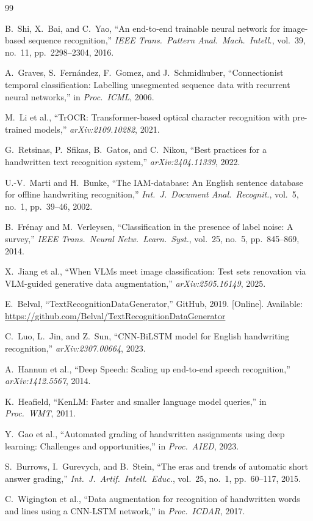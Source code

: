 \documentclass[conference]{IEEEtran}
\begin{document}

\begin{thebibliography}{99}

B.~Shi, X.~Bai, and C.~Yao, ``An end-to-end trainable neural network for image-based sequence recognition,'' \textit{IEEE Trans.\ Pattern Anal.\ Mach.\ Intell.}, vol.~39, no.~11, pp.~2298--2304, 2016.

A.~Graves, S.~Fern\'andez, F.~Gomez, and J.~Schmidhuber, ``Connectionist temporal classification: Labelling unsegmented sequence data with recurrent neural networks,'' in \textit{Proc.\ ICML}, 2006.

M.~Li et al., ``TrOCR: Transformer-based optical character recognition with pre-trained models,'' \textit{arXiv:2109.10282}, 2021.

G.~Retsinas, P.~Sfikas, B.~Gatos, and C.~Nikou, ``Best practices for a handwritten text recognition system,'' \textit{arXiv:2404.11339}, 2022.

U.-V.~Marti and H.~Bunke, ``The IAM-database: An English sentence database for offline handwriting recognition,'' \textit{Int.\ J.\ Document Anal.\ Recognit.}, vol.~5, no.~1, pp.~39--46, 2002.

B.~Fr\'enay and M.~Verleysen, ``Classification in the presence of label noise: A survey,'' \textit{IEEE Trans.\ Neural Netw.\ Learn.\ Syst.}, vol.~25, no.~5, pp.~845--869, 2014.

X.~Jiang et al., ``When VLMs meet image classification: Test sets renovation via VLM-guided generative data augmentation,'' \textit{arXiv:2505.16149}, 2025.

E.~Belval, ``TextRecognitionDataGenerator,'' GitHub, 2019. [Online]. Available: \url{https://github.com/Belval/TextRecognitionDataGenerator}

C.~Luo, L.~Jin, and Z.~Sun, ``CNN-BiLSTM model for English handwriting recognition,'' \textit{arXiv:2307.00664}, 2023.

A.~Hannun et al., ``Deep Speech: Scaling up end-to-end speech recognition,'' \textit{arXiv:1412.5567}, 2014.

K.~Heafield, ``KenLM: Faster and smaller language model queries,'' in \textit{Proc.\ WMT}, 2011.

Y.~Gao et al., ``Automated grading of handwritten assignments using deep learning: Challenges and opportunities,'' in \textit{Proc.\ AIED}, 2023.

S.~Burrows, I.~Gurevych, and B.~Stein, ``The eras and trends of automatic short answer grading,'' \textit{Int.\ J.\ Artif.\ Intell.\ Educ.}, vol.~25, no.~1, pp.~60--117, 2015.

C.~Wigington et al., ``Data augmentation for recognition of handwritten words and lines using a CNN-LSTM network,'' in \textit{Proc.\ ICDAR}, 2017.

\end{thebibliography}
\end{document}
